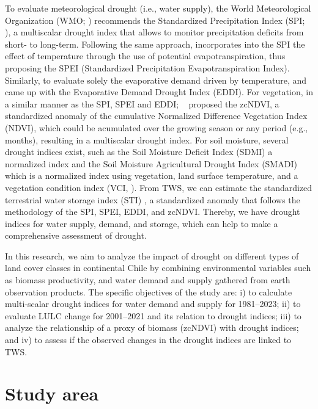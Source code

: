 \documentclass[
  number,
  preprint,
  3p]{elsarticle}
\begin{document}
To evaluate meteorological drought (i.e., water supply), the World
Meteorological Organization (WMO; \citep{WMO2012}) recommends the
Standardized Precipitation Index (SPI; \citep{Mckee1993}), a multiscalar
drought index that allows to monitor precipitation deficits from short-
to long-term. Following the same approach, \citep{Vicente-Serrano2010}
incorporates into the SPI the effect of temperature through the use of
potential evapotranspiration, thus proposing the SPEI (Standardized
Precipitation Evapotranspiration Index). Similarly, to evaluate solely
the evaporative demand driven by temperature, \citep{Hobbins2016} and
\citep{McEvoy2016} came up with the Evaporative Demand Drought Index
(EDDI). For vegetation, in a similar manner as the SPI, SPEI and EDDI;
~\citep{Zambrano2018} proposed the zcNDVI, a standardized anomaly of the
cumulative Normalized Difference Vegetation Index (NDVI), which could be
acumulated over the growing season or any period (e.g., months),
resulting in a multiscalar drought index. For soil moisture, several
drought indices exist, such as the Soil Moisture Deficit Index (SDMI) a
normalized index \citep{Narasimhan2005} and the Soil Moisture
Agricultural Drought Index (SMADI) \citep{Souza2021} which is a
normalized index using vegetation, land surface temperature, and a
vegetation condition index (VCI, \citep{Kogan1995}). From TWS, we can
estimate the standardized terrestrial water storage index (STI)
\citep{Cui2021}, a standardized anomaly that follows the methodology of
the SPI, SPEI, EDDI, and zcNDVI. Thereby, we have drought indices for
water supply, demand, and storage, which can help to make a
comprehensive assessment of drought.

In this research, we aim to analyze the impact of drought on different
types of land cover classes in continental Chile by combining
environmental variables such as biomass productivity, and water demand
and supply gathered from earth observation products. The specific
objectives of the study are: i) to calculate multi-scalar drought
indices for water demand and supply for 1981--2023; ii) to evaluate LULC
change for 2001--2021 and its relation to drought indices; iii) to
analyze the relationship of a proxy of biomass (zcNDVI) with drought
indices; and iv) to assess if the observed changes in the drought
indices are linked to TWS.

\hypertarget{study-area}{%
\section{Study area}\label{study-area}}
\end{document}
